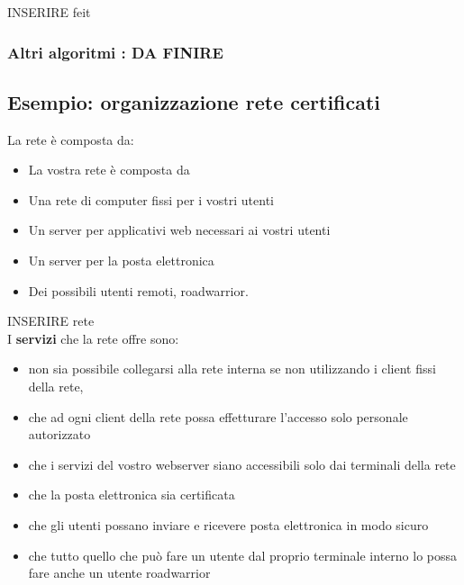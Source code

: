 \documentclass[12pt]{article}
\begin{document}
			INSERIRE feit\\
			
		\subsubsection{Altri algoritmi : DA FINIRE}
	\subsection{Esempio: organizzazione rete certificati}
		La rete è composta da:
		\begin{itemize}
			\item La vostra rete è composta da
			\item Una rete di computer fissi per i vostri utenti
			\item Un server per applicativi web necessari ai vostri utenti
			\item Un server per la posta elettronica
			\item Dei possibili utenti remoti, roadwarrior.
		\end{itemize}
	
		INSERIRE rete\\
		
		I \textbf{servizi} che la rete offre sono:
		\begin{itemize}
			\item non sia possibile collegarsi alla rete interna se non utilizzando i client fissi
			della rete,
			\item che ad ogni client della rete possa effetturare l’accesso solo personale
			autorizzato
			\item che i servizi del vostro webserver siano accessibili solo dai terminali della
			rete
			\item che la posta elettronica sia certificata
			\item che gli utenti possano inviare e ricevere posta elettronica in modo sicuro
			\item che tutto quello che può fare un utente dal proprio terminale interno lo
			possa fare anche un utente roadwarrior
		\end{itemize} 
		
				
			
			 
						
				
				
				
				
				
				
				
				
				
				
				
			
		
			
			
			
				
				
				
				
				
			
			
		
		
		
				
				
				
		
			
			
				
			
			
			
			 
						
		
		
		
			
		
				 
\end{document}
